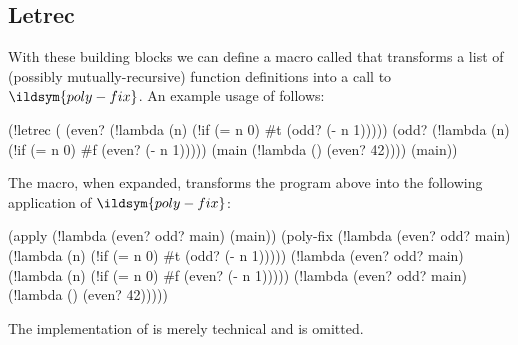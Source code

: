 \subsection{Letrec}
\label{letrec}
With these building blocks we can define a
macro called  that transforms a list of (possibly mutually-recursive)
function definitions into a call to \(\ildsym{poly-fix}\). An example usage of  follows:
\begin{listingbox}\begin{ildcode}
(!letrec (
    (even? (!lambda (n)
      (!if (= n 0) #t (odd? (- n 1)))))
    (odd? (!lambda (n)
      (!if (= n 0) #f (even? (- n 1)))))
    (main (!lambda () (even? 42))))
  (main))
\end{ildcode}\end{listingbox}
The  macro, when expanded, transforms the program above into the following
application of \(\ildsym{poly-fix}\):
\begin{listingbox}\begin{ildcode}
(apply
  (!lambda (even? odd? main) (main))
  (poly-fix
    (!lambda (even? odd? main)
      (!lambda (n) (!if (= n 0) #t (odd? (- n 1)))))
    (!lambda (even? odd? main)
      (!lambda (n) (!if (= n 0) #f (even? (- n 1)))))
    (!lambda (even? odd? main)
      (!lambda () (even? 42)))))
\end{ildcode}\end{listingbox}
\label{letrec-expansion}
The implementation of  is merely technical and is omitted.
